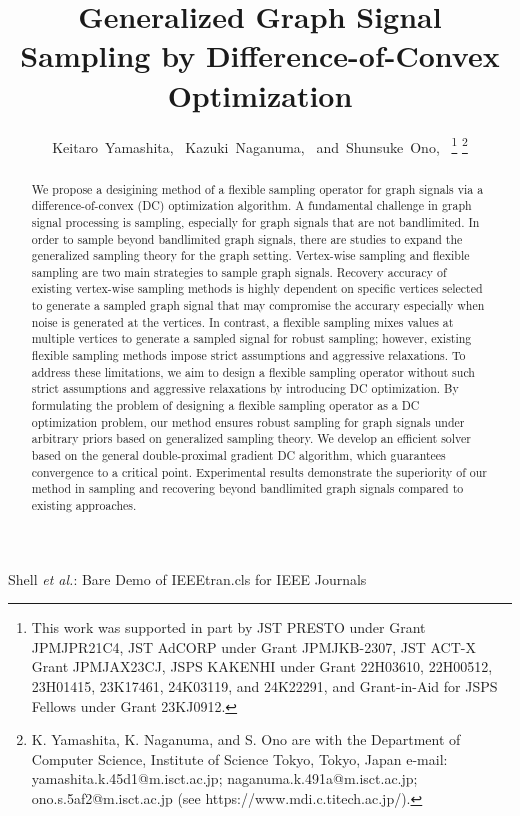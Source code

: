 \documentclass[journal]{IEEEtran}
\begin{document}
\title{Generalized Graph Signal Sampling by Difference-of-Convex Optimization}

\author{Keitaro~Yamashita,~
        Kazuki~Naganuma,~
        and~Shunsuke~Ono,~
\thanks{This work was supported in part by JST PRESTO under Grant JPMJPR21C4, JST AdCORP under Grant JPMJKB-2307, JST ACT-X Grant JPMJAX23CJ, JSPS KAKENHI under Grant 22H03610, 22H00512, 23H01415, 23K17461, 24K03119, and 24K22291, and Grant-in-Aid for JSPS Fellows under Grant 23KJ0912.}
\thanks{K. Yamashita, K. Naganuma, and S. Ono are with the Department
of Computer Science, Institute of Science Tokyo, Tokyo,
Japan e-mail: yamashita.k.45d1@m.isct.ac.jp; naganuma.k.491a@m.isct.ac.jp; ono.s.5af2@m.isct.ac.jp (see https://www.mdi.c.titech.ac.jp/).}}

{Shell \MakeLowercase{\textit{et al.}}: Bare Demo of IEEEtran.cls for IEEE Journals}
\maketitle
\begin{abstract}
    We propose a desigining method of a flexible sampling operator for graph signals via a difference-of-convex (DC) optimization algorithm.
    A fundamental challenge in graph signal processing is sampling, especially for graph signals that are not bandlimited.
    In order to sample beyond bandlimited graph signals, there are studies to expand the generalized sampling theory for the graph setting.
    Vertex-wise sampling and flexible sampling are two main strategies to sample graph signals.
    Recovery accuracy of existing vertex-wise sampling methods is highly dependent on specific vertices selected to generate a sampled graph signal that may compromise the accurary especially when noise is generated at the vertices.
    In contrast, a flexible sampling mixes values at multiple vertices to generate a sampled signal for robust sampling; however, existing flexible sampling methods impose strict assumptions and aggressive relaxations.
    To address these limitations, we aim to design a flexible sampling operator without such strict assumptions and aggressive relaxations by introducing DC optimization.
    By formulating the problem of designing a flexible sampling operator as a DC optimization problem, our method ensures robust sampling for graph signals under arbitrary priors based on generalized sampling theory.
    We develop an efficient solver based on the general double-proximal gradient DC algorithm, which guarantees convergence to a critical point. 
    Experimental results demonstrate the superiority of our method in sampling and recovering beyond bandlimited graph signals compared to existing approaches.
\end{abstract}
\end{document}
